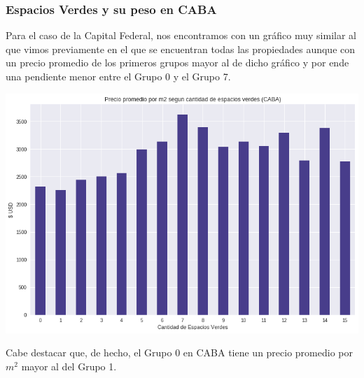 \documentclass[a4paper, 10pt]{article}
\newcommand\tab[1][0.5cm]{\hspace*{#1}}
\begin{document}
			\subsubsection{Espacios Verdes y su peso en CABA}
				Para el caso de la Capital Federal, nos encontramos con un gráfico muy similar al que vimos previamente en el que
				se encuentran todas las propiedades aunque con un precio promedio de los primeros grupos mayor al de dicho gráfico
				y por ende una pendiente menor entre el Grupo 0 y el Grupo 7.
				\begin{center}
					\includegraphics[width=\textwidth]{images/parksM2-CABA}
				\end{center}
				\tab Cabe destacar que, de hecho, el Grupo 0 en CABA tiene un precio promedio por $m^2$ mayor al del Grupo 1.
\end{document}
